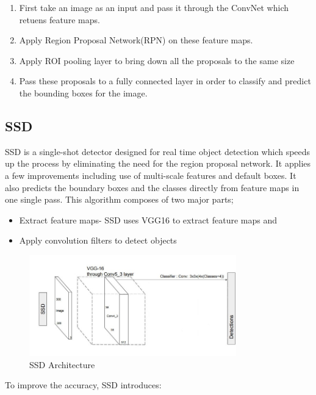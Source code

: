 \documentclass[12pt]{report}
\begin{document}
\begin{enumerate}[topsep=0pt]

\item First take an image as an input and pass it through the ConvNet which retuens feature maps.

\item Apply Region Proposal Network(RPN) on these feature maps.

\item Apply ROI pooling layer to bring down all the proposals to the same size

\item Pass these proposals to a fully connected layer in order to classify and predict the bounding boxes for the image.


\end{enumerate}



\subsection{SSD}

SSD is a single-shot detector designed for real time object detection which speeds up the process by eliminating the need for the region proposal network. It applies a few improvements including use of multi-scale features and default boxes. It also predicts the boundary boxes and the classes directly from feature maps in one single pass\cite{SSD}. This algorithm composes of two major parts;

\begin{itemize}[topsep=0pt]

\item Extract feature maps- SSD uses VGG16 to extract feature maps and 

\item Apply convolution filters to detect objects

\end{itemize}

\begin{figure}[h!]\includegraphics[width=0.8\textwidth]{SSD.jpeg}\caption{SSD Architecture \cite{SSD} }\label{fig:SSD Architecture} \end{figure}%
To improve the accuracy, SSD introduces:
\end{document}

